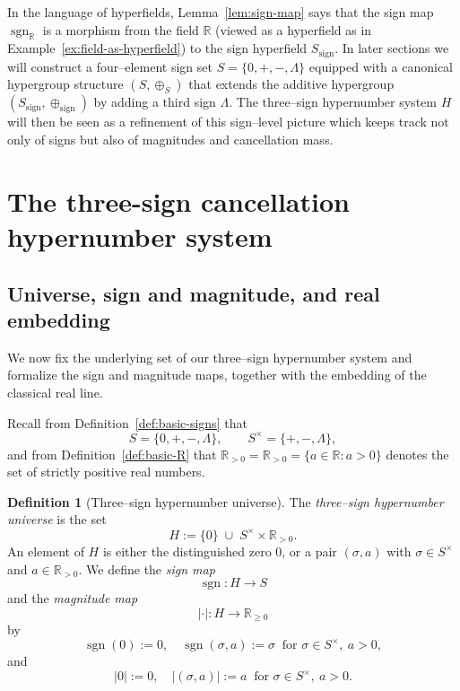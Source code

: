 \documentclass[11pt]{amsart}
\numberwithin{equation}{section}
\theoremstyle{definition}
\newtheorem{definition}[theorem]{Definition}
\theoremstyle{remark}
\newcommand{\R}{\mathbb{R}}
\newcommand{\Rp}{\mathbb{R}_{>0}}
\newcommand{\Hnum}{H}                      %
\newcommand{\Sset}{S}                      %
\newcommand{\Snon}{S^{\times}}             %
\newcommand{\sgn}{\operatorname{sgn}}
\newcommand{\sop}{\oplus_S}                %
\begin{document}
In the language of hyperfields, Lemma~\ref{lem:sign-map} says that the
sign map $\operatorname{sgn}_\R$ is a morphism from the field $\R$
(viewed as a hyperfield as in
Example~\ref{ex:field-as-hyperfield}) to the sign hyperfield
$S_{\mathrm{sign}}$.  In later sections we will construct a
four–element sign set $\Sset=\{0,+,-,\Lambda\}$ equipped with a
canonical hypergroup structure $(\Sset,\sop)$ that extends the additive
hypergroup $(S_{\mathrm{sign}},\oplus_{\mathrm{sign}})$ by adding a
third sign $\Lambda$.  The three–sign hypernumber system $\Hnum$ will
then be seen as a refinement of this sign–level picture which keeps
track not only of signs but also of magnitudes and cancellation mass.


\section{The three-sign cancellation hypernumber system}
\label{sec:3CHS}

\subsection{Universe, sign and magnitude, and real embedding}
\label{subsec:universe-embedding}

We now fix the underlying set of our three--sign hypernumber system and
formalize the sign and magnitude maps, together with the embedding of
the classical real line.

Recall from Definition~\ref{def:basic-signs} that
\[
  \Sset = \{0,+,-,\Lambda\},\qquad
  \Snon = \{+,-,\Lambda\},
\]
and from Definition~\ref{def:basic-R} that
$\Rp = \Rp = \{a\in\R : a>0\}$ denotes the set of strictly positive
real numbers.

\begin{definition}[Three--sign hypernumber universe]\label{def:H-universe}
The \emph{three--sign hypernumber universe} is the set
\[
  \Hnum := \{0\} \;\cup\; \Snon\times\Rp.
\]
An element of $\Hnum$ is either the distinguished zero $0$, or a pair
$(\sigma,a)$ with $\sigma\in\Snon$ and $a\in\Rp$.  We define the
\emph{sign map}
\[
  \sgn : \Hnum \longrightarrow \Sset
\]
and the \emph{magnitude map}
\[
  |\cdot| : \Hnum \longrightarrow \R_{\ge0}
\]
by
\[
  \sgn(0) := 0,\quad
  \sgn(\sigma,a) := \sigma \ \text{ for }\sigma\in\Snon,\ a>0,
\]
and
\[
  |0| := 0,\quad
  |(\sigma,a)| := a \ \text{ for }\sigma\in\Snon,\ a>0.
\]
\end{definition}
\end{document}
